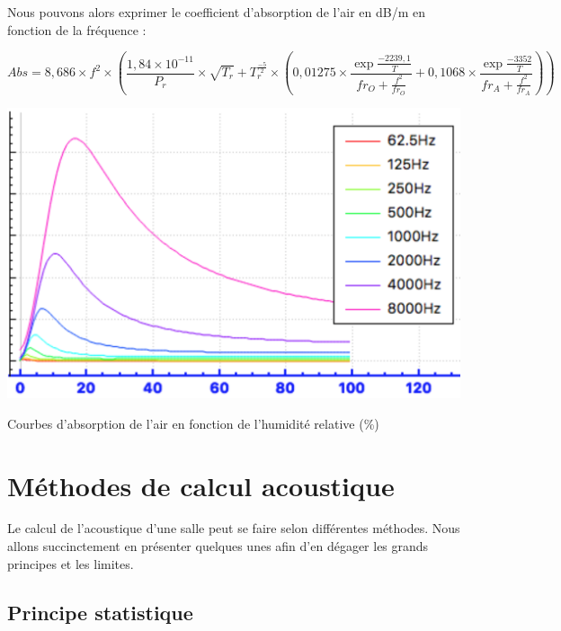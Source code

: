 Nous pouvons alors exprimer le coefficient d'absorption de l'air en dB/m en fonction de la fréquence  \cite[6.2, eq. 5]{iso} :

\begin{equation}
	Abs = 8,686 \times f^2 \times (\frac{1,84 \times 10^{-11}}{P_r} \times \sqrt{T_r} + T_r^{\frac{-5}{2}} \times (0,01275 \times \frac{\exp{\frac{-2239,1}{T}}}{fr_O + \frac{f^2}{fr_O}} + 0,1068 \times  \frac{\exp{\frac{-3352}{T}}}{fr_A + \frac{f^2}{fr_A}}))
\end{equation}

\begin{figureth}
	\includegraphics[width=0.8\linewidth]{images/courbesAbs}
	\caption{Courbes d'absorption de l'air en fonction de l'humidité relative (\%)}
	\label{courbesAbs}
\end{figureth}











\section{Méthodes de calcul acoustique} 
Le calcul de l'acoustique d'une salle peut se faire selon différentes méthodes. Nous allons succinctement en présenter quelques unes afin d'en dégager les grands principes et les limites.

	\subsection{Principe statistique}

